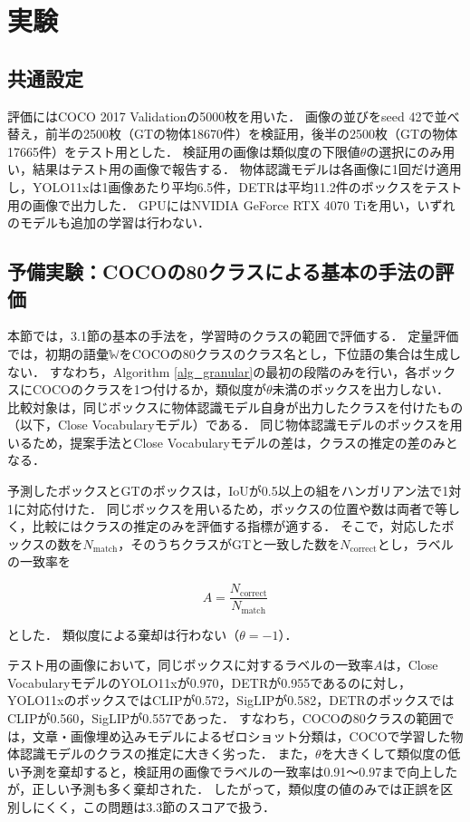 \section{実験}
\subsection{共通設定}
評価にはCOCO 2017 Validationの5000枚を用いた．
画像の並びをseed 42で並べ替え，前半の2500枚（GTの物体18670件）を検証用，後半の2500枚（GTの物体17665件）をテスト用とした．
検証用の画像は類似度の下限値$ \theta $の選択にのみ用い，結果はテスト用の画像で報告する．
物体認識モデルは各画像に1回だけ適用し，YOLO11xは1画像あたり平均6.5件，DETRは平均11.2件のボックスをテスト用の画像で出力した．
GPUにはNVIDIA GeForce RTX 4070 Tiを用い，いずれのモデルも追加の学習は行わない．

\subsection{予備実験：COCOの80クラスによる基本の手法の評価}
本節では，3.1節の基本の手法を，学習時のクラスの範囲で評価する．
定量評価では，初期の語彙$ {\mathbb W} $をCOCOの80クラスのクラス名とし，下位語の集合は生成しない．
すなわち，Algorithm \ref{alg_granular}の最初の段階のみを行い，各ボックスにCOCOのクラスを1つ付けるか，類似度が$ \theta $未満のボックスを出力しない．
比較対象は，同じボックスに物体認識モデル自身が出力したクラスを付けたもの（以下，Close Vocabularyモデル）である．
同じ物体認識モデルのボックスを用いるため，提案手法とClose Vocabularyモデルの差は，クラスの推定の差のみとなる．

予測したボックスとGTのボックスは，IoUが0.5以上の組をハンガリアン法\cite{ref_Hungarian}で1対1に対応付けた．
同じボックスを用いるため，ボックスの位置や数は両者で等しく，比較にはクラスの推定のみを評価する指標が適する．
そこで，対応したボックスの数を$ N_{\mathrm{match}} $，そのうちクラスがGTと一致した数を$ N_{\mathrm{correct}} $とし，ラベルの一致率を

\begin{equation}
    A = \frac{N_{\mathrm{correct}}}{N_{\mathrm{match}}}
    \label{eq_metrics}
\end{equation}

\noindent
とした．
類似度による棄却は行わない（$ \theta = -1 $）．

テスト用の画像において，同じボックスに対するラベルの一致率$ A $は，Close VocabularyモデルのYOLO11xが0.970，DETRが0.955であるのに対し，YOLO11xのボックスではCLIPが0.572，SigLIPが0.582，DETRのボックスではCLIPが0.560，SigLIPが0.557であった．
すなわち，COCOの80クラスの範囲では，文章・画像埋め込みモデルによるゼロショット分類は，COCOで学習した物体認識モデルのクラスの推定に大きく劣った．
また，$ \theta $を大きくして類似度の低い予測を棄却すると，検証用の画像でラベルの一致率は0.91〜0.97まで向上したが，正しい予測も多く棄却された．
したがって，類似度の値のみでは正誤を区別しにくく，この問題は3.3節のスコアで扱う．

